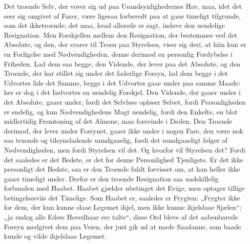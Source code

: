 \documentclass[12pt]{book}
\begin{document}
Det troende Selv, der vover sig ud paa Usandsynlighedernes Hav, maa,
idet det seer sig omgivet af Farer, være ligesaa forberedt paa at
gaae timeligt tilgrunde, som det ikketroende; det maa, hvad allerede
er sagt, indøve den uendelige Resignation. Men Forskjellen mellem
den Resignation, der bestemmes ved det Absolute, og den, der svarer
til Troen paa Styrelsen, viser sig deri, at hiin kun er en Forligelse
med Nødvendigheden, denne derimod en personlig Fordybelse i
Friheden. Lad dem saa begge, den Vidende, der lever paa det
Absolute, og den Troende, der har stillet sig under det faderlige
Forsyn, lad dem begge i det Udvortes lide det Samme, begge i det
Udvortes gaae under paa samme Maade: her er dog i det Indvortes en
uendelig Forskjel. Den Vidende, der gaaer under i det Absolute,
gaaer under, fordi det Selvløse opløser Selvet, fordi
Personligheden er endelig, og kun Nødvendighedens Magt uendelig,
fordi den Enkelte, en blot midlertidig Fremtoning af det Almene, maa
forsvinde i Døden. Den Troende derimod, der lever under Forsynet,
gaaer ikke under i nogen Fare, den være nok saa truende og
tilsyneladende uundgaaelig, fordi det uundgaaeligt følger af
Nødvendigheden, men fordi Styrelsen vil det. Og hvorfor vil
Styrelsen det? Fordi det saaledes er det Bedste, er det for denne
Personlighed Tjenligste. Er det ikke personligt det Bedste, saa er
den Troende fuldt forvisset om, at han heller ikke gaaer timeligt
under. Derfor er den troende Resignation saa uadskillelig forbunden
med Haabet. Haabet gjælder ubetinget det Evige, men optager tillige
betingelsesviis det Timelige. Som Haabet er, saaledes er Frygten:
„Frygter ikke for dem, der kun kunne slaae Legemet ihjel, men ikke
kunne ihjelslaae Sjælen“; „ja endog alle Eders Hovedhaar ere
talte“, disse Ord bleve af det aabenbarede Forsyn medgivet dem paa
Veien, der just gik ud at møde Saadanne, som baade kunde og vilde
ihjelslaae Legemet.
\end{document}
